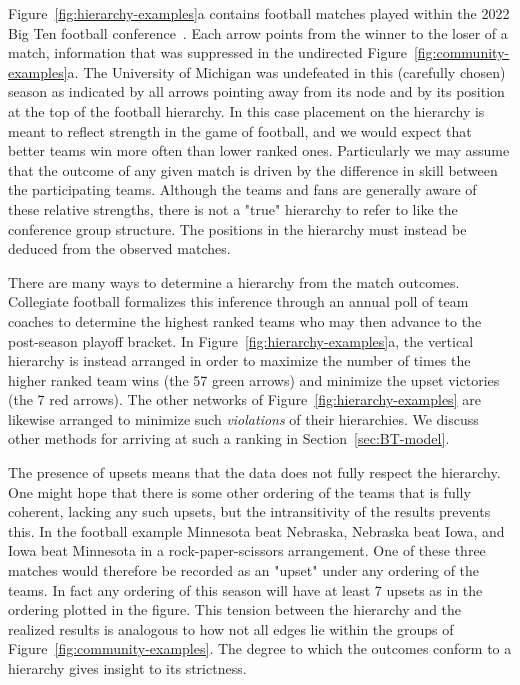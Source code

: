 Figure~\ref{fig:hierarchy-examples}a contains football matches played within the 2022 Big Ten football conference~\cite{Football22}. Each arrow points from the winner to the loser of a match, information that was suppressed in the undirected Figure~\ref{fig:community-examples}a. The University of Michigan was undefeated in this (carefully chosen) season as indicated by all arrows pointing away from its node and by its position at the top of the football hierarchy. In this case placement on the hierarchy is meant to reflect strength in the game of football, and we would expect that better teams win more often than lower ranked ones. Particularly we may assume that the outcome of any given match is driven by the difference in skill between the participating teams. Although the teams and fans are generally aware of these relative strengths, there is not a "true" hierarchy to refer to like the conference group structure. The positions in the hierarchy must instead be deduced from the observed matches. 

There are many ways to determine a hierarchy from the match outcomes. Collegiate football formalizes this inference through an annual poll of team coaches to determine the highest ranked teams who may then advance to the post-season playoff bracket. In Figure~\ref{fig:hierarchy-examples}a, the vertical hierarchy is instead arranged in order to maximize the number of times the higher ranked team wins (the 57 green arrows) and minimize the upset victories (the 7 red arrows). The other networks of Figure~\ref{fig:hierarchy-examples} are likewise arranged to minimize such \emph{violations} of their hierarchies. We discuss other methods for arriving at such a ranking in Section~\ref{sec:BT-model}. 

The presence of upsets means that the data does not fully respect the hierarchy. One might hope that there is some other ordering of the teams that is fully coherent, lacking any such upsets, but the intransitivity of the results prevents this. In the football example Minnesota beat Nebraska, Nebraska beat Iowa, and Iowa beat Minnesota in a rock-paper-scissors arrangement. One of these three matches would therefore be recorded as an "upset" under any ordering of the teams. In fact any ordering of this season will have at least 7 upsets as in the ordering plotted in the figure. This tension between the hierarchy and the realized results is analogous to how not all edges lie within the groups of Figure~\ref{fig:community-examples}. The degree to which the outcomes conform to a hierarchy gives insight to its strictness. 

